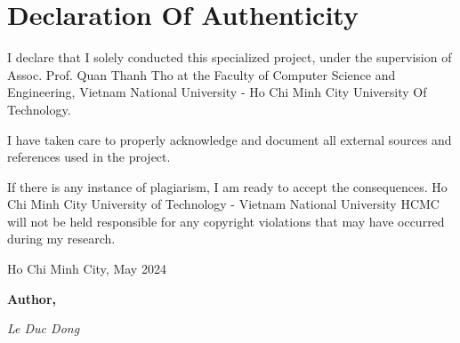 \newpage

\section*{\Huge Declaration Of Authenticity}

I declare that I solely conducted this specialized project, under the supervision of Assoc. Prof. Quan Thanh Tho at the Faculty of Computer Science and Engineering, Vietnam National University - Ho Chi Minh City University Of Technology.

I have taken care to properly acknowledge and document all external sources and references used in the project.

If there is any instance of plagiarism, I am ready to accept the consequences. Ho Chi Minh City University of Technology - Vietnam National University HCMC will not be held responsible for any copyright violations that may have occurred during my research.
\newline

\begin{flushright}
\begin{minipage}[t]{0.48\textwidth}
\begin{center}
    Ho Chi Minh City, May 2024
    
    \textbf{Author,}

    \textit{Le Duc Dong}
    \end{center}
\end{minipage}
\end{flushright}
\begin{flushright}
    
\end{flushright}